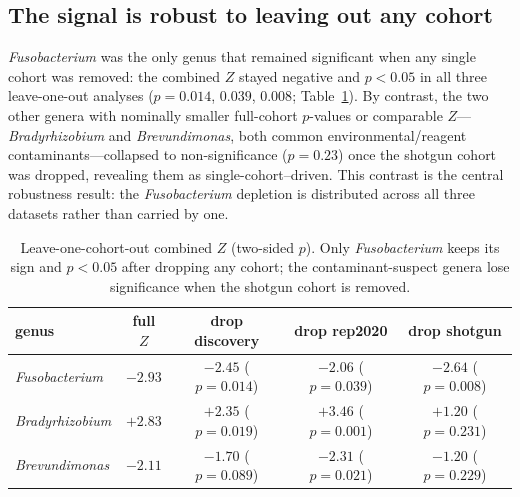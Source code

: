 \documentclass[11pt]{article}
\begin{document}
\subsection{The signal is robust to leaving out any cohort}
\textit{Fusobacterium} was the only genus that remained significant when any
single cohort was removed: the combined $Z$ stayed negative and $p<0.05$ in all
three leave-one-out analyses ($p=0.014$, $0.039$, $0.008$; Table~\ref{tab:loo}).
By contrast, the two other genera with nominally smaller full-cohort $p$-values or
comparable $Z$---\textit{Bradyrhizobium} and \textit{Brevundimonas}, both common
environmental/reagent contaminants---collapsed to non-significance ($p=0.23$) once
the shotgun cohort was dropped, revealing them as single-cohort--driven. This
contrast is the central robustness result: the \textit{Fusobacterium} depletion is
distributed across all three datasets rather than carried by one.

\begin{table}[t]
\centering
\small
\begin{tabular}{lcccc}
\toprule
genus & full $Z$ & drop discovery & drop rep2020 & drop shotgun \\
\midrule
\textit{Fusobacterium}  & $-2.93$ & $-2.45$ ($p{=}0.014$) & $-2.06$ ($p{=}0.039$) & $-2.64$ ($p{=}0.008$) \\
\textit{Bradyrhizobium} & $+2.83$ & $+2.35$ ($p{=}0.019$) & $+3.46$ ($p{=}0.001$) & $+1.20$ ($p{=}0.231$) \\
\textit{Brevundimonas}  & $-2.11$ & $-1.70$ ($p{=}0.089$) & $-2.31$ ($p{=}0.021$) & $-1.20$ ($p{=}0.229$) \\
\bottomrule
\end{tabular}
\caption{Leave-one-cohort-out combined $Z$ (two-sided $p$). Only
\textit{Fusobacterium} keeps its sign and $p<0.05$ after dropping any cohort;
the contaminant-suspect genera lose significance when the shotgun cohort is removed.}
\label{tab:loo}
\end{table}
\end{document}
